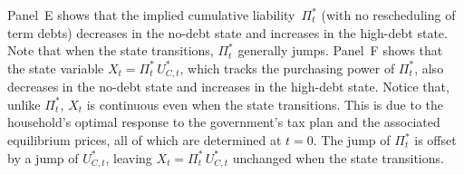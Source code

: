 \documentclass[12pt]{article}
\newcommand{\NW}[1]{{\textcolor{blue}{#1}}}
\begin{document}
Panel~E shows that the implied cumulative liability~$\Pi_t^*$  (with no rescheduling of term debts) decreases in the no-debt state and increases in the high-debt state. Note that when the state transitions, $\Pi_t^*$  generally jumps. %
Panel~F shows that the state variable $X_t = \Pi_t^*\, U_{C,t}^*$, which tracks the purchasing power of $\Pi_t^\ast$, also decreases in the no-debt state and increases in the high-debt state. Notice that,  unlike $\Pi_t^*$, $X_t$ is continuous even when the state transitions. This is due to the household's optimal response to the government's tax plan and the associated equilibrium prices, all of which are determined at $t=0$. %
The  jump of $\Pi_t^\ast$  is offset  by a jump of $U_{C,t}^\ast$, leaving $X_t = \Pi_t^*\, U_{C,t}^*$ unchanged when the state transitions. 






%
%
%
\end{document}
